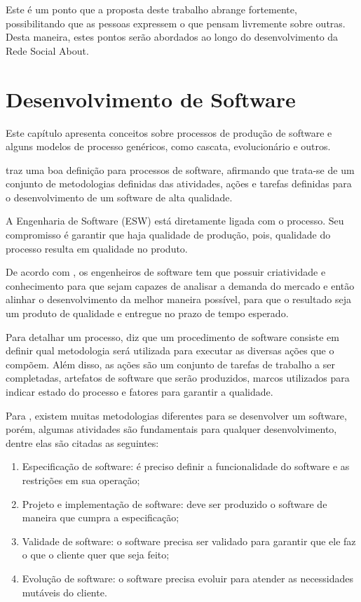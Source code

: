 Este é um ponto que a proposta deste trabalho abrange fortemente, possibilitando que
as pessoas expressem o que pensam livremente sobre outras. Desta maneira,
estes pontos serão abordados ao longo do desenvolvimento da Rede Social About.

\section{Desenvolvimento de Software}
\label{sec:processo_de_desenvolvimento_de_software}
Este capítulo apresenta conceitos sobre processos de produção de software e alguns modelos de processo genéricos, como cascata, evolucionário e outros.

\cite{pressman2009engenharia} traz uma boa definição para processos de software, afirmando que trata-se de um conjunto de metodologias definidas das atividades, ações e tarefas definidas para o desenvolvimento de um software de alta qualidade.

A Engenharia de Software (ESW) está diretamente ligada com o processo. Seu compromisso é garantir que haja qualidade de produção, pois, qualidade do processo resulta em qualidade no produto.

De acordo com \cite{pressman2009engenharia}, os engenheiros de software tem que possuir criatividade e conhecimento para que sejam capazes de analisar a demanda do mercado e então alinhar o desenvolvimento da melhor maneira possível, para que o resultado seja um produto de qualidade e entregue no prazo de tempo esperado.

 Para detalhar um processo, \cite{pressman2009engenharia} diz que um procedimento de software consiste em definir qual metodologia será utilizada para executar as diversas ações que o compõem. Além disso, as ações são um conjunto de tarefas de trabalho a ser completadas, artefatos de software que serão produzidos, marcos utilizados para indicar estado do processo e fatores para garantir a qualidade.

Para \cite{sommerville2011software}, existem muitas metodologias diferentes para se desenvolver um software, porém, algumas atividades são fundamentais para qualquer desenvolvimento, dentre elas são citadas as seguintes:

\begin{enumerate}
    \item Especificação de software: é preciso definir a funcionalidade do software e as restrições em sua operação;

    \item Projeto e implementação de software: deve ser produzido o software de maneira que cumpra a especificação;

    \item Validade de software: o software precisa ser validado para garantir que ele faz o que o cliente quer que seja feito;

    \item Evolução de software: o software precisa evoluir para atender as necessidades mutáveis do cliente.
\end{enumerate}


